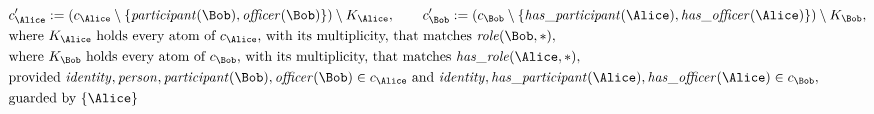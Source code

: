 \begin{align*}
&
c'_
{
\Alice
}
 := 
(c_
{
\Alice
}
 \setminus 
\{
\mathit{\detokenize{
participant
}}
(
\Bob
)
,
\mathit{\detokenize{
officer
}}
(
\Bob
)
\}
) \setminus K_
{
\Alice
}
, \qquad 
c'_
{
\Bob
}
 := 
(c_
{
\Bob
}
 \setminus 
\{
\mathit{\detokenize{
has_participant
}}
(
\Alice
)
,
\mathit{\detokenize{
has_officer
}}
(
\Alice
)
\}
) \setminus K_
{
\Bob
}
,\\
&
\text{where } K_
{
\Alice
}
 \text{ holds every atom of } c_
{
\Alice
}
 \text{, with its multiplicity, that matches } 
\mathit{\detokenize{
role
}}
(
\Bob
,
\ast
)
,\\
&
\text{where } K_
{
\Bob
}
 \text{ holds every atom of } c_
{
\Bob
}
 \text{, with its multiplicity, that matches } 
\mathit{\detokenize{
has_role
}}
(
\Alice
,
\ast
)
,\\
&
\text{provided } 
\mathit{\detokenize{
identity
}}
,
\mathit{\detokenize{
person
}}
,
\mathit{\detokenize{
participant
}}
(
\Bob
)
,
\mathit{\detokenize{
officer
}}
(
\Bob
)
 \in c_
{
\Alice
}
 \text{ and } 
\mathit{\detokenize{
identity
}}
,
\mathit{\detokenize{
has_participant
}}
(
\Alice
)
,
\mathit{\detokenize{
has_officer
}}
(
\Alice
)
 \in c_
{
\Bob
}
,\\
&
\text{guarded by } \{
\Alice
\}
\end{align*}

